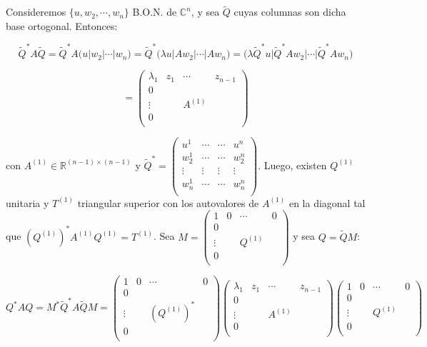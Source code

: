 Consideremos $\{u, w_{2}, \cdots, w_{n}\}$ B.O.N. de $\mathbb{C}^{n}$, y sea $\tilde{Q}$ cuyas columnas son dicha base ortogonal. Entonces:

$$\tilde{Q}^{*}A\tilde{Q} = \tilde{Q}^{*}A\bigg(u\bigg|w_{2}\bigg| \cdots \bigg|w_{n}\bigg) = \tilde{Q}^{*}\bigg(\lambda u\bigg|Aw_{2}\bigg| \cdots \bigg|Aw_{n}\bigg) = \bigg(\lambda \tilde{Q}^{*}u\bigg|\tilde{Q}^{*}Aw_{2}\bigg| \cdots \bigg|\tilde{Q}^{*}Aw_{n}\bigg)$$

$$=
	\begin{pmatrix}
        \lambda_{1} & z_{1} & \cdots & z_{n - 1}\\
        0 &  &  & \\
        \vdots &  & A^{(1)} &  \\
        0  &  &  & \\
	\end{pmatrix}
$$

con $A^{(1)} \in \mathbb{R}^{(n - 1) \times (n - 1)}$ y $\tilde{Q}^{*} = \begin{pmatrix}
        u^{1} & \cdots & \cdots & u^{n}\\
        w_{2}^{1} & \cdots & \cdots & w_{2}^{n}\\
        \vdots & \vdots & \vdots & \vdots\\
        w_{n}^{1} & \cdots & \cdots & w_{n}^{n}\\
	\end{pmatrix}
$. Luego, existen $Q^{(1)}$ unitaria y $T^{(1)}$ triangular superior con los autovalores de $A^{(1)}$ en la diagonal tal que $(Q^{(1)})^{*}A^{(1)}Q^{(1)} = T^{(1)}$. Sea $M =
	\begin{pmatrix}
        1 & 0 & \cdots & 0\\
        0 &  &  & \\
        \vdots &  & Q^{(1)} &  \\
        0  &  &  & \\
	\end{pmatrix}
$ y sea $Q = \tilde{Q}M$:

$$Q^{*}AQ = M^{*}\tilde{Q}^{*}A\tilde{Q}M = 
	\begin{pmatrix}
        1 & 0 & \cdots & 0\\
        0 &  &  & \\
        \vdots &  & (Q^{(1)})^{*} &  \\
        0  &  &  & \\
	\end{pmatrix}
	\begin{pmatrix}
        \lambda_{1} & z_{1} & \cdots & z_{n - 1}\\
        0 &  &  & \\
        \vdots &  & A^{(1)} &  \\
        0  &  &  & \\
	\end{pmatrix}
	\begin{pmatrix}
        1 & 0 & \cdots & 0\\
        0 &  &  & \\
        \vdots &  & Q^{(1)} &  \\
        0  &  &  & \\
	\end{pmatrix}
$$

